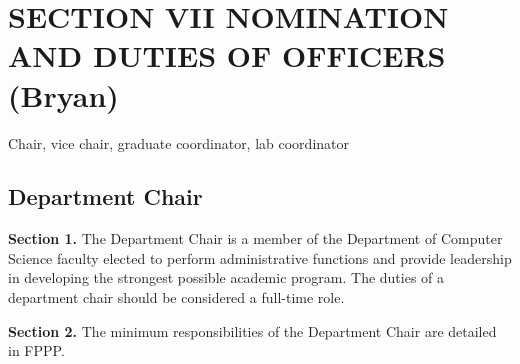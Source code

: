 \documentclass{scrartcl}
\begin{document}
\section*{SECTION VII NOMINATION AND DUTIES OF OFFICERS (Bryan)}
{}


Chair, vice chair, graduate coordinator, lab coordinator

\subsection*{Department Chair}
{}


\textbf{Section 1.} The Department Chair is a member of the Department of Computer Science faculty elected to perform administrative functions and provide leadership in developing the strongest possible academic program. The duties of a department chair should be considered a full-time role.

\textbf{Section 2.} The minimum responsibilities of the Department Chair are detailed in FPPP.
\end{document}
